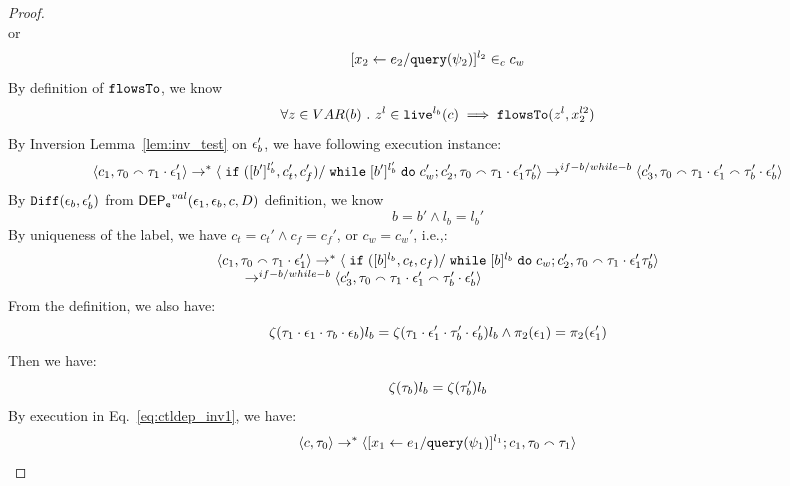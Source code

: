 \begin{proof}
\[\]
or
\[
    [\mathrel{ {x}_2 \leftarrow e_2 / {\tt query}(\psi_2) }]^{l_2} \in_c c_w
\]
%
By definition of $\mathtt{flowsTo}$, we know
\begin{equation}
\label{eq:ctldep_btoevent2}
 \forall z \in VAR(b) ~.~ z^l \in \mathtt{live}^{l_b}(c) \implies \mathtt{flowsTo}(z^l, x_2^{l2})
\end{equation} 
%
By Inversion Lemma~\ref{lem:inv_test} on $\mathtt{\epsilon}_b'$, we have following execution instance: 
 \[
  \langle c_1, \mathtt{\tau}_0 \smallfrown \mathtt{\tau}_1 \cdot \mathtt{\epsilon}_1' \rangle 
  \rightarrow^{*} 
  \langle \;\mathtt{if}\;([b']{}^{l_b'}, c_t', c_f') / \;\mathtt{while}\; [b']{}^{l_b'} \;\mathtt{do}\; c_w'; {c}_2',
  \mathtt{\tau}_0 \smallfrown \mathtt{\tau}_1 \cdot \mathtt{\epsilon}_1' \mathtt{\tau}_b' \rangle 
  \rightarrow^{if-b / while-b} 
  \langle {c}_3',  \mathtt{\tau}_0 \smallfrown \mathtt{\tau}_1 \cdot \mathtt{\epsilon}_1' \smallfrown \mathtt{\tau}_b' \cdot \mathtt{\epsilon}_b' \rangle 
 \]
 By $\mathtt{Diff}(\mathtt{\epsilon}_b,\mathtt{\epsilon}_b' )$ from $\mathsf{DEP_{\mathtt{e}}}^{val}(\mathtt{\epsilon}_1, \mathtt{\epsilon}_b, c, D)$ definition, we know
 \[
 b = b' \land l_b = l_b'
 \]
 By uniqueness of the label, we have $c_t = c_t' \land c_f = c_f'$, or $c_w = c_w'$, i.e.,:
 \begin{equation}
\label{eq:ctldep_inv2}
  \begin{array}{l}   
\langle c_1, \mathtt{\tau}_0 \smallfrown \mathtt{\tau}_1 \cdot \mathtt{\epsilon}_1' \rangle 
  \rightarrow^{*} 
  \langle \;\mathtt{if}\;([b]{}^{l_b}, c_t, c_f) / \;\mathtt{while}\; [b]{}^{l_b} \;\mathtt{do}\; c_w; {c}_2',
   \mathtt{\tau}_0 \smallfrown \mathtt{\tau}_1 \cdot \mathtt{\epsilon}_1' \mathtt{\tau}_b' \rangle 
   \\ \qquad
  \rightarrow^{if-b / while-b} 
  \langle {c}_3',  \mathtt{\tau}_0 \smallfrown \mathtt{\tau}_1 \cdot \mathtt{\epsilon}_1' \smallfrown \mathtt{\tau}_b' \cdot \mathtt{\epsilon}_b' \rangle 
\end{array}
\end{equation}
%
From the definition, we also have:
\[
  \mathtt{\zeta}(\mathtt{\tau}_1 \cdot \mathtt{\epsilon}_1 \cdot \mathtt{\tau}_b\cdot \mathtt{\epsilon}_b) l_b
= 
\mathtt{\zeta}(\mathtt{\tau}_1 \cdot \mathtt{\epsilon}_1' \cdot \mathtt{\tau}_b'\cdot \mathtt{\epsilon}_b') l_b
\land 
\pi_2(\mathtt{\epsilon}_1) = \pi_2(\mathtt{\epsilon}_1')
\]
%
Then we have:
 \begin{equation}
\label{eq:ctldep_invn}
  \mathtt{\zeta}(\mathtt{\tau}_b) l_b = \mathtt{\zeta}(\mathtt{\tau}_b') l_b
\end{equation}
 By execution in Eq.~\ref{eq:ctldep_inv1}, we have:
\[
\langle {c}, \mathtt{\tau}_0 \rangle \rightarrow^{*} 
\langle [\mathrel{ {x}_1 \leftarrow e_1 / {\tt query}(\psi_1) }]^{l_1} ; {c}_1, \mathtt{\tau}_0 \smallfrown \mathtt{\tau}_1 \rangle  
\]
\end{proof}
